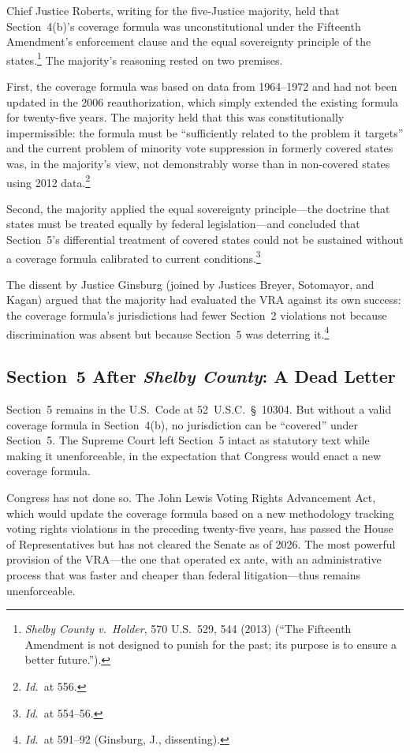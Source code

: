 Chief Justice Roberts, writing for the five-Justice majority, held
that Section~4(b)'s coverage formula was unconstitutional under the
Fifteenth Amendment's enforcement clause and the equal sovereignty
principle of the states.\footnote{\textit{Shelby County v.\ Holder},
570 U.S.\ 529, 544 (2013) (``The Fifteenth Amendment is not designed
to punish for the past; its purpose is to ensure a better future.'').}
The majority's reasoning rested on two premises.

First, the coverage formula was based on data from 1964--1972 and had
not been updated in the 2006 reauthorization, which simply extended the
existing formula for twenty-five years. The majority held that this was
constitutionally impermissible: the formula must be ``sufficiently
related to the problem it targets'' and the current problem of minority
vote suppression in formerly covered states was, in the majority's view,
not demonstrably worse than in non-covered states using 2012 data.\footnote{
\textit{Id.}\ at 556.}

Second, the majority applied the equal sovereignty principle---the
doctrine that states must be treated equally by federal legislation---and
concluded that Section~5's differential treatment of covered states
could not be sustained without a coverage formula calibrated to
current conditions.\footnote{\textit{Id.}\ at 554--56.}

The dissent by Justice Ginsburg (joined by Justices Breyer, Sotomayor,
and Kagan) argued that the majority had evaluated the VRA against its
own success: the coverage formula's jurisdictions had fewer Section~2
violations not because discrimination was absent but because Section~5
was deterring it.\footnote{\textit{Id.}\ at 591--92 (Ginsburg, J., dissenting).}

\subsection{Section~5 After \textit{Shelby County}: A Dead Letter}

Section~5 remains in the U.S.\ Code at 52~U.S.C.~\S~10304. But without
a valid coverage formula in Section~4(b), no jurisdiction can be
``covered'' under Section~5. The Supreme Court left Section~5 intact
as statutory text while making it unenforceable, in the expectation
that Congress would enact a new coverage formula.

Congress has not done so. The John Lewis Voting Rights Advancement Act,
which would update the coverage formula based on a new methodology
tracking voting rights violations in the preceding twenty-five years,
has passed the House of Representatives but has not cleared the Senate
as of 2026. The most powerful provision of the VRA---the one that
operated ex ante, with an administrative process that was faster and
cheaper than federal litigation---thus remains unenforceable.

